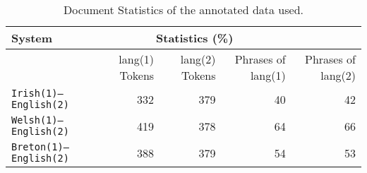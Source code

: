 \documentclass[11pt]{article}
\begin{document}
\begin{table}
\begin{center}
\begin{tabular}{|l|r|r|r|r}
\hline
\textbf{System} &  \multicolumn{3}{c|}{\textbf{Statistics} (\%)} \\
\hline
       &   lang(1) Tokens & lang(2) Tokens & Phrases of lang(1) & Phrases of lang(2) \\
\hline
\texttt{Irish(1)---English(2)} & 332 & 379 & 40 & 42 \\
\hline
\texttt{Welsh(1)---English(2)} & 419 & 378 & 64 & 66 \\
\hline
\texttt{Breton(1)---English(2)} & 388 & 379 & 54 & 53 \\
\hline
\end{tabular}
\end{center}
\label{table:accuracy}
\caption{Document Statistics of the annotated data used.}
\end{table}
\end{document}
